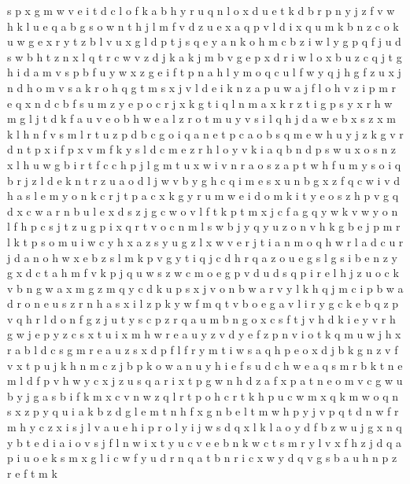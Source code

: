 \documentclass{article}
\begin{document}
s p x g m w v e i t d c l o f k a b h y r u q n
l o x d u e t k
d b r p n y j z f v w h k l u e q a
b g s o w n t h j l m f v d z u e x a q p
v l d i x q u m k b n z c
o
k u w g e x r y t z b l
v u x g l d p t j s q e y a n k o h m c b z i w
l y g p q f j u d s w b h t z n
x l q t r c w v z d j k
a k j m b v g e p x d r i
w l o x b u z c q j t g h i d a m v s
p b f u y
w x z g e i f t p n a h l y m o q c u
l f w y q j h
g f z u x j n d h o m v s a k r
o h q g t m s x j v l d e i k n z a p u w
a j f l o h v z i p m r e q x n d c
b f s u m z y e p o c r j x k g t i q l
n m a x k r z t i g
p s y x r h w m g l j t d k f a u v e o b
h w e a l z
r o t m u y v s i l q h j d a w e b x
s z x m k l h
n f v s m l r t u z p d b c g o i q a
n e t p
c a o b s q m e w h u y j z k g v r d n t p x i f
p
x v m f k y s l d
c m e z r h l o y v k i a q b n d p s w u x
o s n z x l h u w g b i r t f c
c h p j l g m t u x w i v n r a o s z
a p t w h f u m y s o i q b r j z l d e
k n t r z u a o d l j w v b y g h c q i m e s x
u n b g x z f q c w i v d h a s l e m y o
n k c r
j t p a c x k g y r u m w e i d o
m k i t y e o s z h p v g q d x c w a r n b u l
e x d s z j g c w o v l f t
k p t m x j c f a g q y w
k v w y o n l f h p c s j t
z u g p i x q r t v o c n m l s w b j y
q y u z o n v h k g b e j p m r l
k t p s o m u i w c y h x a z
s y u g z l x w v e r j t i a n m o q h
w r l a d
c u r j d a n o h w x e b z s l m k p v g y t i q
j c d h r q a z o u e g s
l g
s i b e n z y g x d c t a h m f v k p j q u w
s z w c m o e g p v d u
d s q p i r e l h j z u o c k v b n g w a x m
g z m q y c d k u p s x j v o n b w a r
v y l k h q j m c i p b w a d r o n e u s z
r n h a s x i l z p k y w f m q t v b o e g
a v l i r y g c k e b q z
p v q h r l d o n f g z j u t y s c
p z r q a u m b n g o x c s f t j v h d k i e y
v r h g w j e p y z c s x t u i
x m h w r e a u y z v d
y e f z p n v i o t k q m u w j h x r a b l d c s g
m r e a u z s x d p f
l f r y m t i w s a q h p e o x d j b k g n z v
f v x t p u j k h n
m c z j b p k o w a n u y h i e f s
u d c h w e a q s m r b k
t n e m l d f p v h w y c x j z u s q a r i
x t p g w n h d z a f
x p a t n e o m v c g w u b
y j g a s b i f k m x c v n w z q l r t p o h
c r
t k h p u c w m
x q k
m w o q n s x z p
y q u i a k b z d g l e m t n h f x
g n b e l t m w h p y j v
p q t d n w f r m h y c z x i s j l v
a u e h i p r o l
y
i j w s d q x l k
l a o y d f b z w u j g x n q
y b t e d i
a i o
v s
j f l n w i x t y u c v e
e b n k w c t s m r y l v x f h z j d q a p i u o
e k s m x g l i c w f y u d r n
q a t b n r
i c x w y d q v g s b a u h n p z r e f t m k
\end{document}
